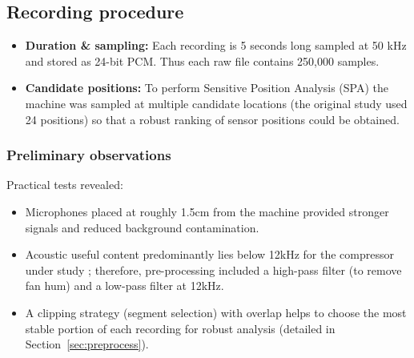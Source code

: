 \documentclass[12pt,a4paper]{article}
\begin{document}
\begin{multicols}{2}
\subsection{Recording procedure}
\begin{itemize}
  \item \textbf{Duration \& sampling:} Each recording is 5 seconds long sampled at 50 kHz and stored as 24-bit PCM. Thus each raw file contains 250,000 samples.
  \item \textbf{Candidate positions:} To perform Sensitive Position Analysis (SPA) the machine was sampled at multiple candidate locations (the original study used 24 positions) so that a robust ranking of sensor positions could be obtained.
\end{itemize}
\subsubsection{Preliminary observations}
Practical tests revealed:
\begin{itemize}
    \item Microphones placed at roughly {1.5}{cm} from the machine provided stronger signals and reduced background contamination.
    \item Acoustic useful content predominantly lies below {12}{kHz} for the compressor under study \cite{Verma2016}; therefore, pre-processing included a high-pass filter (to remove fan hum) and a low-pass filter at {12}{kHz}.
    \item A clipping strategy (segment selection) with overlap helps to choose the most stable portion of each recording for robust analysis (detailed in Section~\ref{sec:preprocess}).
\end{itemize}

\end{multicols}
\end{document}
